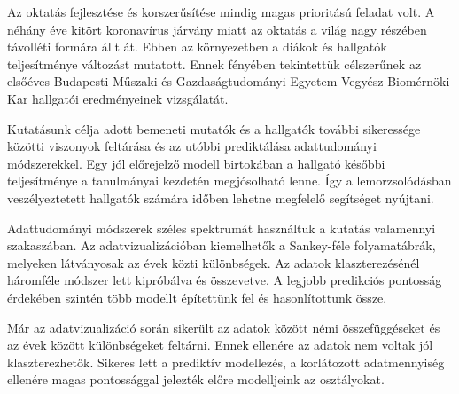 \documentclass[12pt]{article}
\begin{document}
Az oktatás fejlesztése és korszerűsítése mindig magas prioritású feladat volt. A néhány éve kitört koronavírus járvány miatt az oktatás a világ nagy részében távolléti formára állt át. Ebben az környezetben a diákok és hallgatók teljesítménye változást mutatott. Ennek fényében tekintettük célszerűnek az elsőéves Budapesti Műszaki és Gazdaságtudományi Egyetem Vegyész Biomérnöki Kar hallgatói eredményeinek vizsgálatát.

Kutatásunk célja adott bemeneti mutatók és a hallgatók további sikeressége közötti viszonyok feltárása és az utóbbi prediktálása adattudományi módszerekkel. Egy jól előrejelző modell birtokában a hallgató későbbi teljesítménye a tanulmányai kezdetén megjósolható lenne. Így a lemorzsolódásban veszélyeztetett hallgatók számára időben lehetne megfelelő segítséget nyújtani.

Adattudományi módszerek széles spektrumát használtuk a kutatás valamennyi szakaszában. Az adatvizualizációban kiemelhetők a Sankey-féle folyamatábrák, melyeken látványosak az évek közti különbségek. Az adatok klaszterezésénél háromféle módszer lett kipróbálva és összevetve. A legjobb predikciós pontosság érdekében szintén több modellt építettünk fel és hasonlítottunk össze.

Már az adatvizualizáció során sikerült az adatok között némi összefüggéseket és az évek között különbségeket feltárni. Ennek ellenére az adatok nem voltak jól klaszterezhetők. Sikeres lett a prediktív modellezés, a korlátozott adatmennyiség ellenére magas pontossággal jelezték előre modelljeink az osztályokat.
\end{document}
